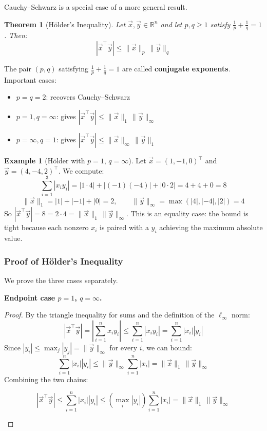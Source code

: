 \documentclass[10pt, twocolumn]{article}
\theoremstyle{definition}
\newtheorem{example}{Example}
\theoremstyle{plain}
\newtheorem{theorem}{Theorem}
\newcommand{\RR}{\mathbb{R}}
\begin{document}
Cauchy--Schwarz is a special case of a more general result.

\begin{tcolorbox}
\begin{theorem}[H\"{o}lder's Inequality]
Let $\vec{x}, \vec{y} \in \RR^n$ and let $p, q \ge 1$ satisfy $\frac{1}{p} + \frac{1}{q} = 1$. Then:
\[
    |\vec{x}^\top \vec{y}| \le \|\vec{x}\|_p \, \|\vec{y}\|_q
\]
\end{theorem}
\end{tcolorbox}

The pair $(p, q)$ satisfying $\frac{1}{p} + \frac{1}{q} = 1$ are called \textbf{conjugate exponents}. Important cases:

\begin{itemize}
    \item $p = q = 2$: recovers Cauchy--Schwarz
    \item $p = 1, q = \infty$: gives $|\vec{x}^\top \vec{y}| \le \|\vec{x}\|_1 \, \|\vec{y}\|_\infty$
    \item $p = \infty, q = 1$: gives $|\vec{x}^\top \vec{y}| \le \|\vec{x}\|_\infty \, \|\vec{y}\|_1$
\end{itemize}

\begin{example}[H\"{o}lder with $p = 1$, $q = \infty$]
Let $\vec{x} = (1, -1, 0)^\top$ and $\vec{y} = (4, -4, 2)^\top$. We compute:
\[
    \sum_{i=1}^{3} |x_i y_i| = |1 \cdot 4| + |(-1)(-4)| + |0 \cdot 2| = 4 + 4 + 0 = 8
\]
\[
    \|\vec{x}\|_1 = |1| + |-1| + |0| = 2, \qquad \|\vec{y}\|_\infty = \max(|4|, |-4|, |2|) = 4
\]
So $|\vec{x}^\top \vec{y}| = 8 = 2 \cdot 4 = \|\vec{x}\|_1 \, \|\vec{y}\|_\infty$. This is an equality case: the bound is tight because each nonzero $x_i$ is paired with a $y_i$ achieving the maximum absolute value.
\end{example}

\subsubsection*{Proof of H\"{o}lder's Inequality}

We prove the three cases separately.

\textbf{Endpoint case $p = 1$, $q = \infty$.}

\begin{proof}
By the triangle inequality for sums and the definition of the $\ell_\infty$ norm:
\[
    |\vec{x}^\top \vec{y}| = \left|\sum_{i=1}^{n} x_i y_i\right| \le \sum_{i=1}^{n} |x_i y_i| = \sum_{i=1}^{n} |x_i| |y_i|
\]
Since $|y_i| \le \max_j |y_j| = \|\vec{y}\|_\infty$ for every $i$, we can bound:
\[
    \sum_{i=1}^{n} |x_i| |y_i| \le \|\vec{y}\|_\infty \sum_{i=1}^{n} |x_i| = \|\vec{x}\|_1 \, \|\vec{y}\|_\infty
\]
Combining the two chains:
\begin{result}
\[
    |\vec{x}^\top \vec{y}| \le \sum_{i=1}^{n} |x_i| |y_i| \le \left(\max_i |y_i|\right) \sum_{i=1}^{n} |x_i| = \|\vec{x}\|_1 \, \|\vec{y}\|_\infty
\]
\end{result}
\end{proof}
\end{document}
